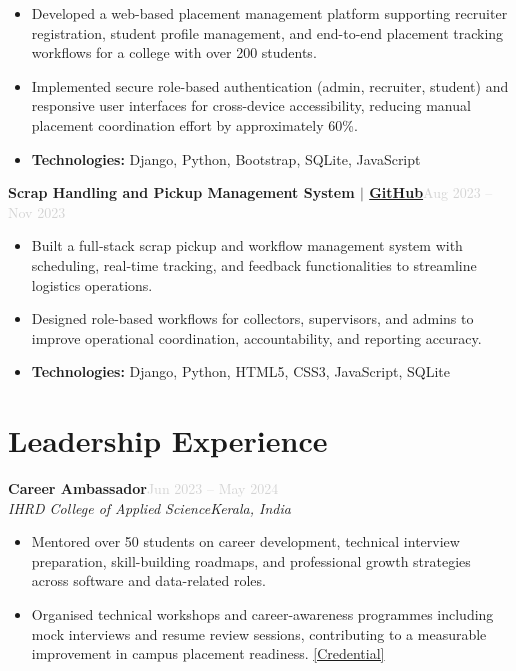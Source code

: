\documentclass[a4paper,10.5pt]{article}
\newcommand{\resumeEntry}[4]{%
  \vspace{3pt}%
  \noindent\textbf{\normalsize #1}\hfill\textcolor{lightgray}{\small #2}\\%
  \noindent\textit{\small #3}\hfill\textit{\small #4}%
  \vspace{2pt}%
}
\newcommand{\resumeProject}[2]{%
  \vspace{3pt}%
  \noindent\textbf{\normalsize #1}\hfill\textcolor{lightgray}{\small #2}%
  \vspace{1pt}%
}
\newcommand{\resumeItem}[1]{%
  \item\small{#1}%
}
\newcommand{\resumeItemListStart}{%
  \begin{itemize}[leftmargin=0.18in, itemsep=2pt, topsep=3pt, parsep=0pt]%
}
\newcommand{\resumeItemListEnd}{%
  \end{itemize}\vspace{2pt}%
}
\begin{document}
\resumeItemListStart
  \resumeItem{
    Developed a web-based placement management platform supporting recruiter registration, student profile management, and end-to-end placement tracking workflows for a college with over 200 students.
  }
  \resumeItem{
    Implemented secure role-based authentication (admin, recruiter, student) and responsive user interfaces for cross-device accessibility, reducing manual placement coordination effort by approximately 60\%.
  }
  \resumeItem{
    \textbf{Technologies:} Django, Python, Bootstrap, SQLite, JavaScript
  }
\resumeItemListEnd

\vspace{4pt}

\resumeProject
  {Scrap Handling and Pickup Management System $|$ \href{https://github.com/Abhijith-E/smart-scrap-management-system}{GitHub}}{Aug 2023 -- Nov 2023}

\resumeItemListStart
  \resumeItem{
    Built a full-stack scrap pickup and workflow management system with scheduling, real-time tracking, and feedback functionalities to streamline logistics operations.
  }
  \resumeItem{
    Designed role-based workflows for collectors, supervisors, and admins to improve operational coordination, accountability, and reporting accuracy.
  }
  \resumeItem{
    \textbf{Technologies:} Django, Python, HTML5, CSS3, JavaScript, SQLite
  }
\resumeItemListEnd


\section{Leadership Experience}

\resumeEntry
  {Career Ambassador}{Jun 2023 -- May 2024}
  {IHRD College of Applied Science}{Kerala, India}

\resumeItemListStart
  \resumeItem{
    Mentored over 50 students on career development, technical interview preparation, skill-building roadmaps, and professional growth strategies across software and data-related roles.
  }
  \resumeItem{
    Organised technical workshops and career-awareness programmes including mock interviews and resume review sessions, contributing to a measurable improvement in campus placement readiness.
    \href{https://github.com/Abhijith-E/leadership-and-professional-credentials/blob/main/Career_Ambassador_Certificate.pdf}{[Credential]}
  }
\resumeItemListEnd

\end{document}
